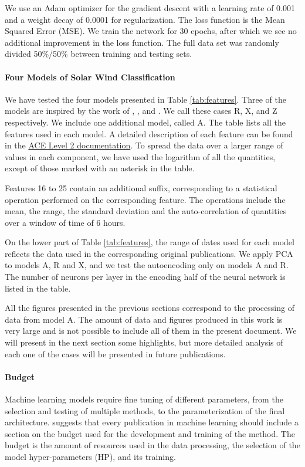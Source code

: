 We use an Adam optimizer \citep{Kingma2014} for the gradient descent with a learning rate of 0.001 and a weight decay of 0.0001 for regularization. The loss function is the Mean Squared Error (MSE). We train the network for 30 epochs, after which we see no additional improvement in the loss function. The full data set was randomly divided 50\%/50\% between training and testing sets.

\paragraph{Four Models of Solar Wind Classification}
\label{sec:fourmodels}
We have tested the four models presented in Table \ref{tab:features}. Three of the models are inspired by the work of \citep{Roberts2020}, \citep{Xu2015b}, and \citep{Zhao2009}. We call these cases R, X, and Z respectively. We include one additional model, called A. The table lists all the features used in each model. A detailed description of each feature can be found in the \href{http://www.srl.caltech.edu/cgi-bin/dib/rundibviewmultil2/ACE/ASC/DATA/level2/multi}{ACE Level 2 documentation}. To spread the data over a larger range of values in each component, we have used the logarithm of all the quantities, except of those marked with an asterisk in the table.

Features 16 to 25 contain an additional suffix, corresponding to a statistical operation performed on the corresponding feature. The operations include the mean, the range, the standard deviation and the auto-correlation of quantities over a window of time of 6 hours.

On the lower part of Table \ref{tab:features}, the range of dates used for each model reflects the data used in the corresponding original publications. We apply PCA to models A, R and X, and we test the autoencoding only on models A and R. The number of neurons per layer in the encoding half of the neural network is listed in the table.

All the figures presented in the previous sections correspond to the processing of data from model A. The amount of data and figures produced in this work is very large and is not possible to include all of them in the present document. We will present in the next section some highlights, but more detailed analysis of each one of the cases will be presented in future publications.

\paragraph{Budget}
Machine learning models require fine tuning of different parameters, from the selection and testing of multiple methods, to the parameterization of the final architecture. \citep{Dodge2019} suggests that every publication in machine learning should include a section on the budget used for the development and training of the method. The budget is the amount of resources used in the data processing, the selection of the model hyper-parameters (HP), and its training.


